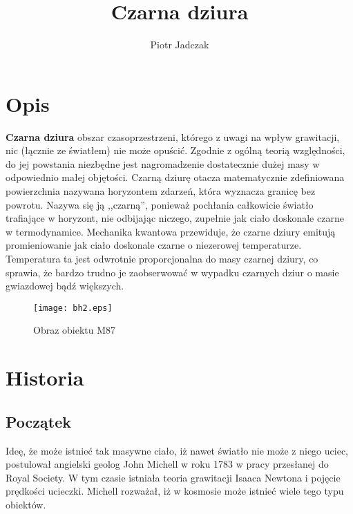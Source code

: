 \documentclass[12pt]{article}
\title{Czarna dziura}
\author{Piotr Jadczak}
\begin{document}
\maketitle
\section{Opis}

\textbf{Czarna dziura} \textendash{} obszar czasoprzestrzeni, kt\'{o}rego z uwagi na wp\l{}yw grawitacji, nic (\l{}\k{a}cznie ze \'{s}wiat\l{}em) nie mo\.{z}e opu\'{s}ci\'{c}. Zgodnie z og\'{o}ln\k{a} teori\k{a} wzgl\k{e}dno\'{s}ci, do jej powstania niezb\k{e}dne jest nagromadzenie dostatecznie du\.{z}ej masy w odpowiednio ma\l{}ej obj\k{e}to\'{s}ci. Czarn\k{a} dziur\k{e} otacza matematycznie zdefiniowana powierzchnia nazywana horyzontem zdarze\'{n}, kt\'{o}ra wyznacza granic\k{e} bez powrotu. Nazywa si\k{e} j\k{a} ,,czarn\k{a}\textquotedblright{}, poniewa\.{z} poch\l{}ania ca\l{}kowicie \'{s}wiat\l{}o trafiaj\k{a}ce w horyzont, nie odbijaj\k{a}c niczego, zupe\l{}nie jak cia\l{}o doskonale czarne w termodynamice. Mechanika kwantowa przewiduje, \.{z}e czarne dziury emituj\k{a} promieniowanie jak cia\l{}o doskonale czarne o niezerowej temperaturze. Temperatura ta jest odwrotnie proporcjonalna do masy czarnej dziury, co sprawia, \.{z}e bardzo trudno je zaobserwowa\'{c} w wypadku czarnych dziur o masie gwiazdowej b\k{a}d\'{z} wi\k{e}kszych.

\begin{figure}
\begin{center}
\texttt{[image: bh2.eps]}
\caption{Obraz obiektu M87}
\end{center}
\end{figure}


\newpage
\section{Historia}
\subsection{Pocz\k{a}tek}
Ide\k{e}, \.{z}e mo\.{z}e istnie\'{c} tak masywne cia\l{}o, i\.{z} nawet \'{s}wiat\l{}o nie mo\.{z}e z niego uciec, postulowa\l{} angielski geolog John Michell w roku 1783 w pracy przes\l{}anej do Royal Society. W tym czasie istnia\l{}a teoria grawitacji Isaaca Newtona i poj\k{e}cie pr\k{e}dko\'{s}ci ucieczki. Michell rozwa\.{z}a\l{}, i\.{z} w kosmosie mo\.{z}e istnie\'{c} wiele tego typu obiekt\'{o}w.
\end{document}
